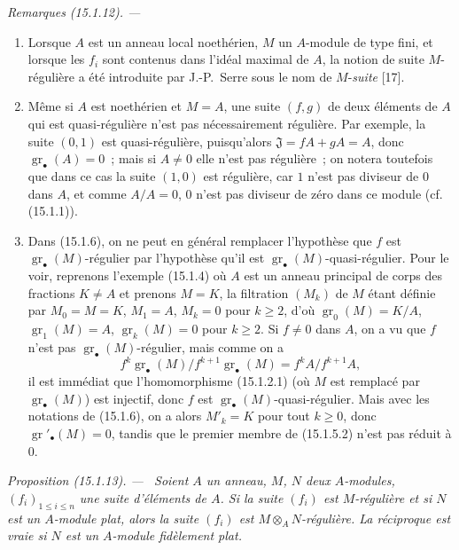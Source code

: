 \documentclass[10pt,oneside]{book}
\makeatletter
\newcommand{\gr}{\operatorname{gr}}
\newcommand{\setmanualcurrentlabel}[1]{\def\@currentlabel{#1}}
\newcommand{\oldpage}[2][]{%
  \setcounter{footnote}{0}%
  \marginpar{\scriptsize\textbf{#1}~|~#2}\ignorespaces}
\newenvironment{proposition}[1][]{%
  \setmanualcurrentlabel{#1}\par\medskip\noindent\itshape Proposition (#1). ---\ }{\par}
\newenvironment{remarks}[1][]{%
  \setmanualcurrentlabel{#1}\par\medskip\noindent\itshape Remarques (#1). ---\ }{\par}
\makeatother
\begin{document}
\begin{remarks}[15.1.12]
\label{0.15.1.12-fr}
\mbox{}
\begin{enumerate}
  \item[(i)] Lorsque $A$ est un anneau local noethérien, $M$ un $A$-module de
  type fini, et lorsque les $f_i$ sont contenus dans l'idéal maximal de $A$,
  la notion de suite $M$-régulière a été introduite par J.-P.~Serre sous le
  nom de $M$-\emph{suite} [17].
  \item[(ii)] Même si $A$ est noethérien et $M=A$, une suite $(f,g)$ de deux
  éléments de $A$ qui est quasi-régulière n'est pas nécessairement régulière.
  Par exemple, la suite $(0,1)$ est quasi-régulière, puisqu'alors
  $\mathfrak{J}=fA+gA=A$, donc $\gr_\bullet(A)=0$~; mais si $A\neq0$ elle
  n'est pas régulière~; on notera toutefois que dans ce cas la suite $(1,0)$
  est régulière, car $1$ n'est pas diviseur de $0$ dans $A$, et comme
  $A/A=0$, $0$ n'est pas diviseur de zéro dans ce module (cf. (15.1.1)).
  \item[(iii)]
  \oldpage[0\textsubscript{IV-1}]{17}
  Dans (15.1.6), on ne peut en général remplacer l'hypothèse que $f$ est
  $\gr_\bullet(M)$-régulier par l'hypothèse qu'il est
  $\gr_\bullet(M)$-quasi-régulier. Pour le voir, reprenons l'exemple (15.1.4)
  où $A$ est un anneau principal de corps des fractions $K\neq A$ et prenons
  $M=K$, la filtration $(M_k)$ de $M$ étant définie par
  $M_0=M=K$, $M_1=A$, $M_k=0$ pour $k\geq2$, d'où
  $\gr_0(M)=K/A$, $\gr_1(M)=A$, $\gr_k(M)=0$ pour $k\geq2$. Si $f\neq0$ dans
  $A$, on a vu que $f$ n'est pas $\gr_\bullet(M)$-régulier, mais comme on a
  \[
    f^k\gr_\bullet(M)/f^{k+1}\gr_\bullet(M)=f^kA/f^{k+1}A,
  \]
  il est immédiat que l'homomorphisme (15.1.2.1) (où $M$ est remplacé par
  $\gr_\bullet(M)$) est injectif, donc $f$ est
  $\gr_\bullet(M)$-quasi-régulier. Mais avec les notations de (15.1.6), on a
  alors $M'_k=K$ pour tout $k\geq0$, donc $\gr'_\bullet(M)=0$, tandis que le
  premier membre de (15.1.5.2) n'est pas réduit à $0$.
\end{enumerate}
\end{remarks}

\begin{proposition}[15.1.13]
\label{0.15.1.13-fr}
Soient $A$ un anneau, $M$, $N$ deux $A$-modules, $(f_i)_{1\leq i\leq n}$ une
suite d'éléments de $A$. Si la suite $(f_i)$ est $M$-régulière et si $N$ est
un $A$-module plat, alors la suite $(f_i)$ est
$M\otimes_A N$-régulière. La réciproque est vraie si $N$ est un $A$-module
fidèlement plat.
\end{proposition}
\end{document}
